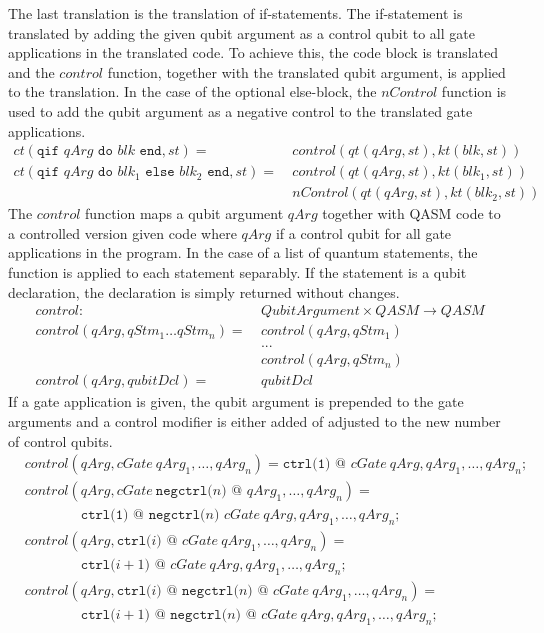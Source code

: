 The last translation is the translation of if-statements. The if-statement is translated by adding the given qubit argument as a control qubit to all gate applications in the translated code. To achieve this, the code block is translated and the $control$ function, together with the translated qubit argument, is applied to the translation. In the case of the optional else-block, the $nControl$ function is used to add the qubit argument as a negative control to the translated gate applications.
\begin{align*}
        ct(\texttt{qif } qArg \texttt{ do } blk \texttt{ end}, st) = \ 
            &  control(qt(qArg, st), kt(blk, st)) \\
        ct(\texttt{qif } qArg \texttt{ do } blk_1 \texttt{ else } blk_2 \texttt{ end}, st) = \ 
            &  control(qt(qArg, st), kt(blk_1, st)) \\
            &  nControl(qt(qArg, st), kt(blk_2, st))
\end{align*}
The $control$ function maps a qubit argument $qArg$ together with QASM code to a controlled version given code where $qArg$ if a control qubit for all gate applications in the program. In the case of a list of quantum statements, the function is applied to each statement separably. If the statement is a qubit declaration, the declaration is simply returned without changes.
\begin{align*}
    control : \ & QubitArgument \times QASM \to QASM\\
    control(qArg, qStm_1 \dots qStm_n) = \ & control(qArg, qStm_1)\\
        & ...\\
        & control(qArg, qStm_n)\\
    control(qArg, qubitDcl) = \ & qubitDcl
\end{align*}
If a gate application is given, the qubit argument is prepended to the gate arguments and a control modifier is either added of adjusted to the new number of control qubits.
\begin{align*}
    &control(qArg, cGate \ qArg_1, \dots, qArg_n ) =  \texttt{ctrl(1) @ } cGate \ qArg, qArg_1, \dots, qArg_n\texttt{;}\\
    &control(qArg, cGate \ \texttt{negctrl(}n\texttt{) @ } qArg_1, \dots, qArg_n ) = \\
    & \quad \quad \quad \quad \texttt{ctrl(1) @ } \texttt{negctrl(}n\texttt{) }cGate \ qArg, qArg_1, \dots, qArg_n\texttt{;}\\
    &control(qArg, \texttt{ctrl(}i \texttt{) @ } cGate \ qArg_1, \dots, qArg_n ) = \\
    & \quad \quad \quad \quad \texttt{ctrl(}i+1 \texttt{) @ } cGate \ qArg, qArg_1, \dots, qArg_n\texttt{;}\\
    &control(qArg, \texttt{ctrl(}i \texttt{) @ } \texttt{negctrl(}n\texttt{) @ } cGate \ qArg_1, \dots, qArg_n ) = \\
    & \quad \quad \quad \quad \texttt{ctrl(}i+1 \texttt{) @ } \texttt{negctrl(}n\texttt{) @ } cGate \ qArg, qArg_1, \dots, qArg_n\texttt{;}
\end{align*}
